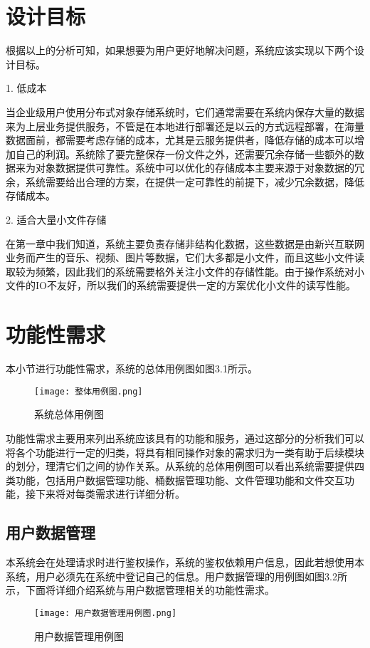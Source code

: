 \section{设计目标}
根据以上的分析可知，如果想要为用户更好地解决问题，系统应该实现以下两个设计目标。

1. 低成本

当企业级用户使用分布式对象存储系统时，它们通常需要在系统内保存大量的数据来为上层业务提供服务，不管是在本地进行部署还是以云的方式远程部署，在海量数据面前，都需要考虑存储的成本，尤其是云服务提供者，降低存储的成本可以增加自己的利润。系统除了要完整保存一份文件之外，还需要冗余存储一些额外的数据来为对象数据提供可靠性。系统中可以优化的存储成本主要来源于对象数据的冗余，系统需要给出合理的方案，在提供一定可靠性的前提下，减少冗余数据，降低存储成本。

2. 适合大量小文件存储

在第一章中我们知道，系统主要负责存储非结构化数据，这些数据是由新兴互联网业务而产生的音乐、视频、图片等数据，它们大多都是小文件，而且这些小文件读取较为频繁，因此我们的系统需要格外关注小文件的存储性能。由于操作系统对小文件的IO不友好，所以我们的系统需要提供一定的方案优化小文件的读写性能。

\section{功能性需求}%
本小节进行功能性需求，系统的总体用例图如图3.1所示。

\begin{figure}[h]
    \centering
    \texttt{[image: 整体用例图.png]}
    \caption{系统总体用例图}
\end{figure}

功能性需求主要用来列出系统应该具有的功能和服务，通过这部分的分析我们可以将各个功能进行一定的归类，将具有相同操作对象的需求归为一类有助于后续模块的划分，理清它们之间的协作关系。从系统的总体用例图可以看出系统需要提供四类功能，包括用户数据管理功能、桶数据管理功能、文件管理功能和文件交互功能，接下来将对每类需求进行详细分析。

\subsection{用户数据管理}
本系统会在处理请求时进行鉴权操作，系统的鉴权依赖用户信息，因此若想使用本系统，用户必须先在系统中登记自己的信息。用户数据管理的用例图如图3.2所示，下面将详细介绍系统与用户数据管理相关的功能性需求。

\begin{figure}[h]
    \centering
    \texttt{[image: 用户数据管理用例图.png]}
    \caption{用户数据管理用例图}
\end{figure}


